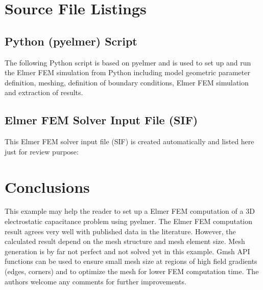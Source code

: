 \documentclass[10pt,a4paper,titlepage]{article}
\begin{document}
\section{Source File Listings}

\subsection{Python (pyelmer) Script}\label{3835864466}

The following Python script is based on pyelmer \cite{pyelmer} and is used to set up and run the Elmer FEM simulation from Python including model geometric parameter definition, meshing, definition of boundary conditions, Elmer FEM simulation and extraction of results. 

\clearpage



\lstset{style=myStyle}



\clearpage
\subsection{Elmer FEM Solver Input File (SIF)}

This Elmer FEM solver input file (SIF) is created automatically and listed here just for review purpose:




\section{Conclusions}

This example may help the reader to set up a Elmer FEM computation of a 3D electrostatic capacitance problem using pyelmer. The Elmer FEM computation result agrees very well with published data in the literature. However, the calculated result depend on the mesh structure and mesh element size. Mesh generation is by far not perfect and not solved yet in this example. Gmsh API functions can be used to ensure small mesh size at regions of high field gradients (edges, corners) and to optimize the mesh for lower FEM computation time. The authors welcome any comments for further improvements.

\clearpage
\printbibliography

	
\end{document}
